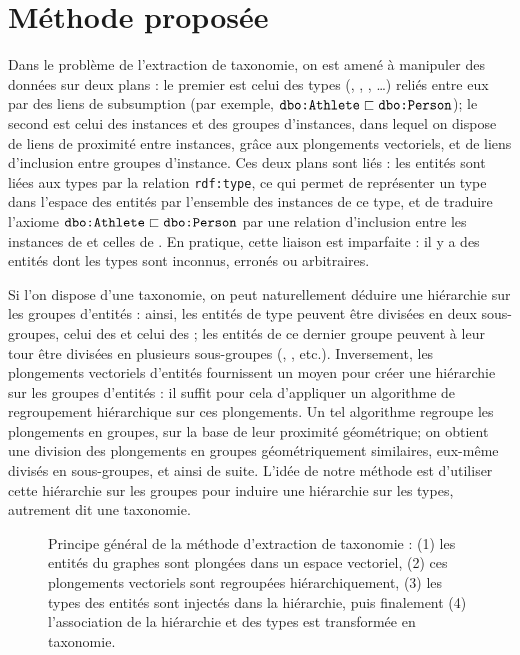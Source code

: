 \section{Méthode proposée}
\label{sec:te-method}

Dans le problème de l'extraction de taxonomie, on est amené à manipuler des données sur deux plans : le premier est celui des types (, , , \ldots) reliés entre eux par des liens de subsumption (par exemple, $\texttt{dbo:Athlete} \sqsubset \texttt{dbo:Person}$); le second est celui des instances et des groupes d'instances, dans lequel on dispose de liens de proximité entre instances, grâce aux plongements vectoriels, et de liens d'inclusion entre groupes d'instance. Ces deux plans sont liés : les entités sont liées aux types par la relation \texttt{rdf:type}, ce qui permet de représenter un type dans l'espace des entités par l'ensemble des instances de ce type, et de traduire l'axiome $\texttt{dbo:Athlete} \sqsubset \texttt{dbo:Person}$ par une relation d'inclusion entre les instances de  et celles de . En pratique, cette liaison est imparfaite : il y a des entités dont les types sont inconnus, erronés ou arbitraires.


Si l'on dispose d'une taxonomie, on peut naturellement déduire une hiérarchie sur les groupes d'entités : ainsi, les entités de type  peuvent être divisées en deux sous-groupes, celui des  et celui des ; les entités de ce dernier groupe peuvent à leur tour être divisées en plusieurs sous-groupes (, , etc.). Inversement, les plongements vectoriels d'entités fournissent un moyen pour créer une hiérarchie sur les groupes d'entités : il suffit pour cela d'appliquer un algorithme de regroupement hiérarchique sur ces plongements. Un tel algorithme regroupe les plongements en groupes, sur la base de leur proximité géométrique; on obtient une division des plongements en groupes géométriquement similaires, eux-même divisés en sous-groupes, et ainsi de suite. L'idée de notre méthode est d'utiliser cette hiérarchie sur les groupes pour induire une hiérarchie sur les types, autrement dit une taxonomie.

\begin{figure}[h]
    \centering
    
    \caption[Principe général de l'extraction de taxonomie]{Principe général de la méthode d'extraction de taxonomie : (1) les entités du graphes sont plongées dans un espace vectoriel, (2) ces plongements vectoriels sont regroupées hiérarchiquement, (3) les types des entités sont injectés dans la hiérarchie, puis finalement (4) l'association de la hiérarchie et des types est transformée en taxonomie.}
    \label{fig:te-summary}
\end{figure}

